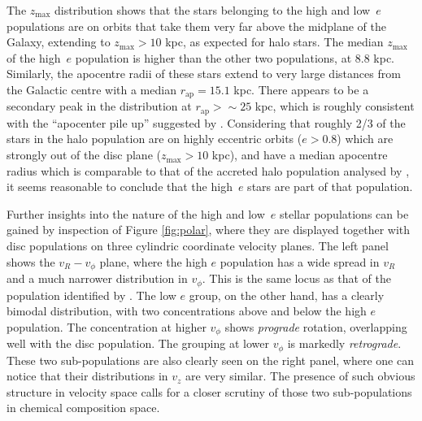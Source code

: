 The $z_\mathrm{max}$ distribution shows that the stars belonging
to the high and low~$e$ populations are on orbits that take them
very far above the midplane of the Galaxy, extending to $z_\mathrm{max}>10$
kpc, as expected for halo stars. The median $z_\mathrm{max}$ of the
high~$e$ population is higher than the other two populations, at
8.8 kpc. Similarly, the apocentre radii of these stars extend to
very large distances from the Galactic centre with a median
$r_\mathrm{ap} = 15.1$ kpc.  There appears to be a secondary peak
in the distribution at $r_\mathrm{ap} >\sim25$ kpc, which is roughly
consistent with the ``apocenter pile up'' suggested by
\citet{2018arXiv180510288D}.  Considering that roughly 2/3
of the stars in the halo population are on highly eccentric orbits
($e > 0.8$) which are strongly out of the disc plane ($z_\mathrm{max}
> 10$ kpc), and have a median apocentre radius which is comparable
to that of the accreted halo population analysed by
\citet{2018arXiv180510288D}, it seems reasonable to conclude that
the high~$e$ stars are part of that population.

Further insights into the nature of the high and low~$e$ stellar
populations can be gained by inspection of Figure \ref{fig:polar},
where they are displayed together with disc populations on three
cylindric coordinate velocity planes.  The left panel shows
the $v_R-v_\phi$ plane, where the high $e$ population has a wide
spread in $v_R$ and a much narrower distribution in $v_\phi$.  This
is the same locus as that of the population identified by \citet[][their
Figure 2]{2018MNRAS.478..611B}.  The low $e$ group, on the other
hand, has a clearly bimodal distribution, with two concentrations
above and below the high $e$ population.  The concentration at
higher $v_\phi$ shows {\it prograde} rotation, overlapping well
with the disc population.  The grouping at lower $v_\phi$ is markedly
{\it retrograde}.  These two sub-populations are also clearly seen
on the right panel, where one can notice that their distributions
in $v_z$ are very similar.  The presence of such obvious structure
in velocity space calls for a closer scrutiny of those two
sub-populations in chemical composition space.

